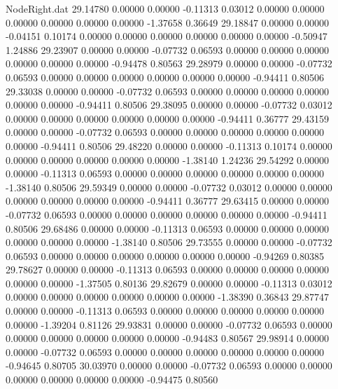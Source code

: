 \begin{filecontents}{NodeRight.dat}
  29.14780    0.00000    0.00000    -0.11313    0.03012    0.00000    0.00000    0.00000    0.00000    0.00000    0.00000   -1.37658    0.36649
  29.18847    0.00000    0.00000    -0.04151    0.10174    0.00000    0.00000    0.00000    0.00000    0.00000    0.00000   -0.50947    1.24886
  29.23907    0.00000    0.00000    -0.07732    0.06593    0.00000    0.00000    0.00000    0.00000    0.00000    0.00000   -0.94478    0.80563
  29.28979    0.00000    0.00000    -0.07732    0.06593    0.00000    0.00000    0.00000    0.00000    0.00000    0.00000   -0.94411    0.80506
  29.33038    0.00000    0.00000    -0.07732    0.06593    0.00000    0.00000    0.00000    0.00000    0.00000    0.00000   -0.94411    0.80506
  29.38095    0.00000    0.00000    -0.07732    0.03012    0.00000    0.00000    0.00000    0.00000    0.00000    0.00000   -0.94411    0.36777
  29.43159    0.00000    0.00000    -0.07732    0.06593    0.00000    0.00000    0.00000    0.00000    0.00000    0.00000   -0.94411    0.80506
  29.48220    0.00000    0.00000    -0.11313    0.10174    0.00000    0.00000    0.00000    0.00000    0.00000    0.00000   -1.38140    1.24236
  29.54292    0.00000    0.00000    -0.11313    0.06593    0.00000    0.00000    0.00000    0.00000    0.00000    0.00000   -1.38140    0.80506
  29.59349    0.00000    0.00000    -0.07732    0.03012    0.00000    0.00000    0.00000    0.00000    0.00000    0.00000   -0.94411    0.36777
  29.63415    0.00000    0.00000    -0.07732    0.06593    0.00000    0.00000    0.00000    0.00000    0.00000    0.00000   -0.94411    0.80506
  29.68486    0.00000    0.00000    -0.11313    0.06593    0.00000    0.00000    0.00000    0.00000    0.00000    0.00000   -1.38140    0.80506
  29.73555    0.00000    0.00000    -0.07732    0.06593    0.00000    0.00000    0.00000    0.00000    0.00000    0.00000   -0.94269    0.80385
  29.78627    0.00000    0.00000    -0.11313    0.06593    0.00000    0.00000    0.00000    0.00000    0.00000    0.00000   -1.37505    0.80136
  29.82679    0.00000    0.00000    -0.11313    0.03012    0.00000    0.00000    0.00000    0.00000    0.00000    0.00000   -1.38390    0.36843
  29.87747    0.00000    0.00000    -0.11313    0.06593    0.00000    0.00000    0.00000    0.00000    0.00000    0.00000   -1.39204    0.81126
  29.93831    0.00000    0.00000    -0.07732    0.06593    0.00000    0.00000    0.00000    0.00000    0.00000    0.00000   -0.94483    0.80567
  29.98914    0.00000    0.00000    -0.07732    0.06593    0.00000    0.00000    0.00000    0.00000    0.00000    0.00000   -0.94645    0.80705
  30.03970    0.00000    0.00000    -0.07732    0.06593    0.00000    0.00000    0.00000    0.00000    0.00000    0.00000   -0.94475    0.80560

\end{filecontents}
